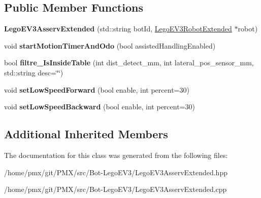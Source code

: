 \subsection*{Public Member Functions}
\begin{DoxyCompactItemize}
\item 
\mbox{\label{classLegoEV3AsservExtended_af679133fbc133cf0574407f045bae0b5}} 
{\bfseries Lego\+E\+V3\+Asserv\+Extended} (std\+::string bot\+Id, \hyperlink{classLegoEV3RobotExtended}{Lego\+E\+V3\+Robot\+Extended} $\ast$robot)
\item 
\mbox{\label{classLegoEV3AsservExtended_a64955f15798cceff7fb78fd7c1c55c47}} 
void {\bfseries start\+Motion\+Timer\+And\+Odo} (bool assisted\+Handling\+Enabled)
\item 
\mbox{\label{classLegoEV3AsservExtended_a38db1fe3ca6df21a4e307c1e94267103}} 
bool {\bfseries filtre\+\_\+\+Is\+Inside\+Table} (int dist\+\_\+detect\+\_\+mm, int lateral\+\_\+pos\+\_\+sensor\+\_\+mm, std\+::string desc=\char`\"{}\char`\"{})
\item 
\mbox{\label{classLegoEV3AsservExtended_a65734aa19c5357f5eac1aadb2343db53}} 
void {\bfseries set\+Low\+Speed\+Forward} (bool enable, int percent=30)
\item 
\mbox{\label{classLegoEV3AsservExtended_ad5895bddffa94a1950b1e3f90d05c35d}} 
void {\bfseries set\+Low\+Speed\+Backward} (bool enable, int percent=30)
\end{DoxyCompactItemize}
\subsection*{Additional Inherited Members}


The documentation for this class was generated from the following files\+:\begin{DoxyCompactItemize}
\item 
/home/pmx/git/\+P\+M\+X/src/\+Bot-\/\+Lego\+E\+V3/Lego\+E\+V3\+Asserv\+Extended.\+hpp\item 
/home/pmx/git/\+P\+M\+X/src/\+Bot-\/\+Lego\+E\+V3/Lego\+E\+V3\+Asserv\+Extended.\+cpp\end{DoxyCompactItemize}
